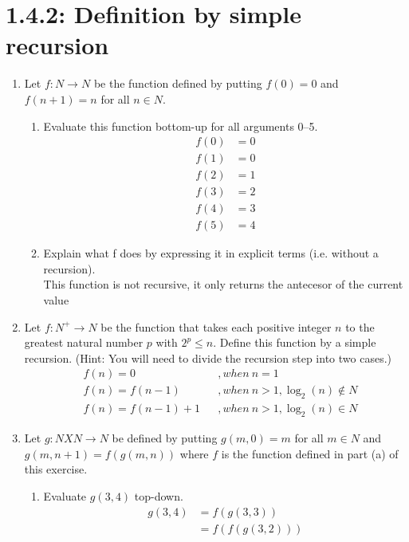 \documentclass{article}
\begin{document}
\section*{1.4.2: Definition by simple recursion}
\begin{enumerate}
    \item  Let $f: N \rightarrow N$ be the function defined by putting $f (0) = 0$ and $f(n+1) = n$ for all $n \in N$.
    \begin{enumerate}
        \item Evaluate this function bottom-up for all arguments 0–5.
        \begin{align*}
            f(0) &= 0\\
            f(1) &= 0\\
            f(2) &= 1\\
            f(3) &= 2\\
            f(4) &= 3\\
            f(5) &= 4
        \end{align*}
        \item Explain what f does by expressing it in explicit terms (i.e. without a recursion).\\
        This function is not recursive, it only returns the antecesor of the current value
    \end{enumerate}
    \item Let $f : N^{+} \rightarrow N$ be the function that takes each positive integer $n$ to the greatest natural number $p$ with $2^{p} \leq n$. Define this function by a simple recursion. (Hint: You will need to divide the recursion step into two cases.)
    \begin{align*}
        &f(n) = 0& &, when\ n = 1\\
        &f(n) = f(n-1)& &, when\ n > 1, \log_{2}(n) \notin N\\
        &f(n) = f(n-1) + 1& &, when\ n > 1, \log_{2}(n) \in N
    \end{align*}
    \item Let $g: NXN \rightarrow N$ be defined by putting $g(m,0)= m$ for all $m \in N$ and $g(m,n+1)=f (g(m,n))$ where $f$ is the function defined in part (a) of this exercise.
    \begin{enumerate}
        \item Evaluate $g(3,4)$ top-down.
        \begin{align*}
            g(3, 4) &= f(g(3, 3))\\
            &= f(f(g(3, 2)))\\

\end{align*}
\end{enumerate}
\end{enumerate}
\end{document}

